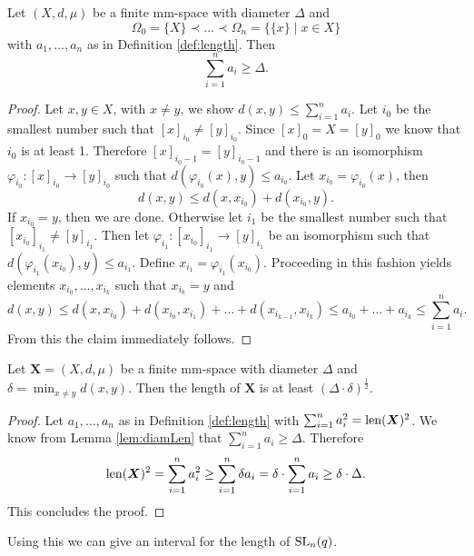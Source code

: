 \begin{lemma}\label{lem:diamLen}
	Let $(X,d,\mu)$ be a finite mm-space with diameter $\Delta$ and %
	\[\Omega_0=\{X\}\prec\dots\prec\Omega_n=\{\{x\}\mid x\in X\}\]
	with $a_1,\dots,a_n$ as in Definition \ref{def:length}. Then 
	\[\sum_{i=1}^{n}a_i\geq \Delta.\]
\end{lemma}
\begin{proof}
	Let $x,y\in X$, with $x\neq y$, we show $d(x,y)\leq\sum_{i=1}^{n}a_i$. Let $i_0$ be the smallest number such that $[x]_{i_0}\neq [y]_{i_0}$. Since $[x]_0=X=[y]_0$ we know that $i_0$ is at least 1. Therefore $[x]_{i_0-1}=[y]_{i_0-1}$ and there is an isomorphism $\varphi_{i_0}\colon[x]_{i_0}\to[y]_{i_0}$ such that $d(\varphi_{i_0}(x),y)\leq a_{i_0}$. %
	Let $x_{i_0}=\varphi_{i_0}(x)$, then 
	\[d(x,y)\leq d(x,x_{i_0})+d(x_{i_0},y).\]
	If $x_{i_0}=y$, then we are done. Otherwise let $i_1$ be the smallest number such that $[x_{i_0}]_{i_1}\neq [y]_{i_1}$. Then let $\varphi_{i_1}\colon[x_{i_0}]_{i_1}\to[y]_{i_1}$ be an isomorphism such that $d(\varphi_{i_1}(x_{i_0}),y)\leq a_{i_1}$. Define $x_{i_1}=\varphi_{i_1}(x_{i_0})$. Proceeding in this fashion yields elements $x_{i_0},\dots,x_{i_k}$ such that $x_{i_k}=y$ and
	\[d(x,y)\leq d(x,x_{i_0})+d(x_{i_0},x_{i_1})+\dots+d(x_{i_{k-1}},x_{i_k})\leq a_{i_0}+\dots +a_{i_k}\leq\sum_{i=1}^{n}a_i.\]
	From this the claim immediately follows.
\end{proof}
		
		
\begin{lemma}\label{lem:lengthLowerBound}
	Let $\boldsymbol{X}=(X,d,\mu)$ be a finite mm-space with diameter $\Delta$ and $\delta=\min_{x\not=y} d(x,y)$. Then the length of $\boldsymbol X$ is at least $(\Delta\cdot\delta)^{\frac{1}{2}}$.
\end{lemma}
\begin{proof}
	Let $a_1,\dots,a_n$ as in Definition \ref{def:length} with $\sum_{i=1}^{n}a_i^2=\operatorname{len}(\boldsymbol{X})^2$.
	We know from Lemma \ref{lem:diamLen} that $\sum_{i=1}^{n}a_i\geq \Delta$. Therefore
	\begin{align*}
		\operatorname{len}(\boldsymbol{X})^2=\sum_{i=1}^{n}a_i^2\geq \sum_{i=1}^{n}\delta a_i=\delta\cdot \sum_{i=1}^{n} a_i \geq \delta\cdot\Delta.
	\end{align*}
	This concludes the proof.	
\end{proof}
		
Using this we can give an interval for the length of $\operatorname{SL}_n(q)$.
		
